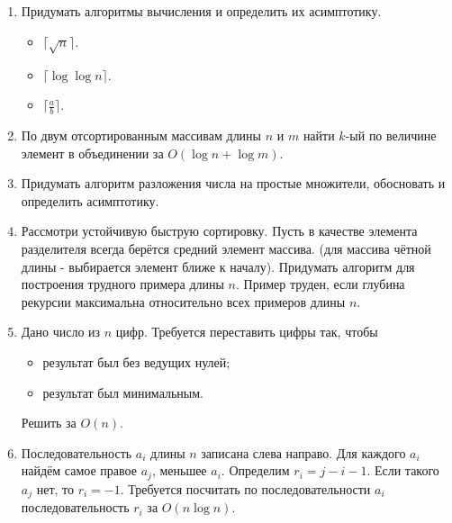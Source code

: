 \section{}

\begin{enumerate}
  \item Придумать алгоритмы вычисления и определить их асимптотику.
    \begin{itemize}
      \item $\lceil \sqrt{n} \rceil$.
      \item $\lceil \log{\log{n}} \rceil$.
      \item $\lceil \frac{a}{b} \rceil$.
    \end{itemize}

  \item По двум отсортированным массивам длины $n$ и $m$ найти $k$-ый по величине
        элемент в объединении за $O(\log n + \log m)$.     
        
  \item Придумать алгоритм разложения числа на простые множители, обосновать и определить асимптотику.
  
  \item Рассмотри устойчивую быструю сортировку. Пусть в качестве элемента разделителя всегда берётся средний элемент массива. (для массива чётной длины - выбирается элемент ближе к началу). Придумать алгоритм для построения трудного примера длины $n$.
	Пример труден, если глубина рекурсии максимальна относительно всех примеров длины $n$.
  
  \item Дано число из $n$ цифр. Требуется переставить цифры так, чтобы
	\begin{itemize}
		\item результат был без ведущих нулей;
		\item результат был минимальным.
	\end{itemize}
	Решить за $O(n)$.
	
  \item Последовательность $a_i$ длины $n$ записана слева направо.  
	Для каждого $a_i$ найдём самое правое $a_j$, меньшее $a_i$. Определим
	$r_i = j - i - 1$. Если такого $a_j$ нет, то $r_i = -1$. Требуется 
	посчитать по последовательности $a_i$ последовательность $r_i$ за $O(n \log n)$.
  
\end{enumerate}


